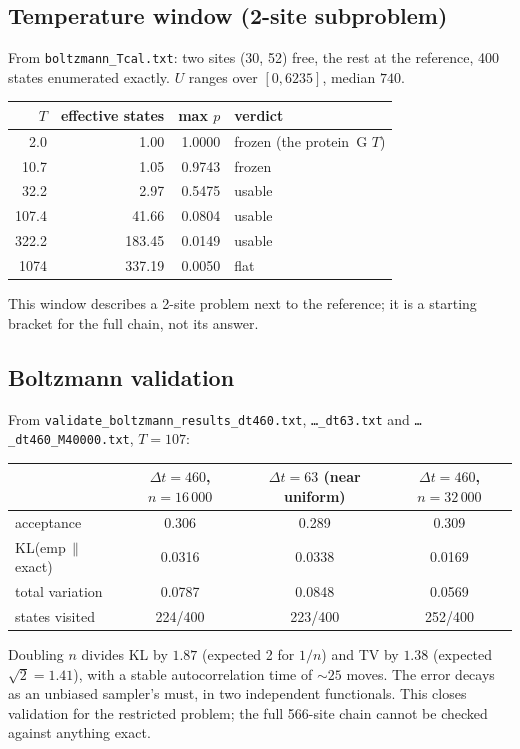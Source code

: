 \documentclass[11pt,a4paper]{article}
\newcommand{\dt}{\Delta t}
\newcommand{\file}[1]{\texttt{#1}}
\begin{document}
\subsection{Temperature window (2-site subproblem)}
From \file{boltzmann\_Tcal.txt}: two sites (30, 52) free, the rest at the
reference, 400 states enumerated exactly. $U$ ranges over $[0, 6235]$, median
$740$.
\begin{center}
\begin{tabular}{@{}rrrl@{}}
\toprule
$T$ & effective states & max $p$ & verdict \\
\midrule
2.0    & 1.00   & 1.0000 & frozen (the protein~G $T$) \\
10.7   & 1.05   & 0.9743 & frozen \\
32.2   & 2.97   & 0.5475 & usable \\
107.4  & 41.66  & 0.0804 & usable \\
322.2  & 183.45 & 0.0149 & usable \\
1074   & 337.19 & 0.0050 & flat \\
\bottomrule
\end{tabular}
\end{center}
This window describes a 2-site problem next to the reference; it is a starting
bracket for the full chain, not its answer.

\subsection{Boltzmann validation}
From \file{validate\_boltzmann\_results\_dt460.txt},
\file{\dots\_dt63.txt} and \file{\dots\_dt460\_M40000.txt}, $T=107$:
\begin{center}
\begin{tabular}{@{}lccc@{}}
\toprule
 & $\dt=460$, $n=16\,000$ & $\dt=63$ (near uniform) & $\dt=460$, $n=32\,000$ \\
\midrule
acceptance          & 0.306  & 0.289  & 0.309 \\
KL(emp$\,\|\,$exact) & 0.0316 & 0.0338 & 0.0169 \\
total variation     & 0.0787 & 0.0848 & 0.0569 \\
states visited      & 224/400 & 223/400 & 252/400 \\
\bottomrule
\end{tabular}
\end{center}
Doubling $n$ divides KL by $1.87$ (expected 2 for $1/n$) and TV by $1.38$
(expected $\sqrt2=1.41$), with a stable autocorrelation time of $\sim25$ moves.
The error decays as an unbiased sampler's must, in two independent functionals.
This closes validation for the restricted problem; the full 566-site chain
cannot be checked against anything exact.
\end{document}

